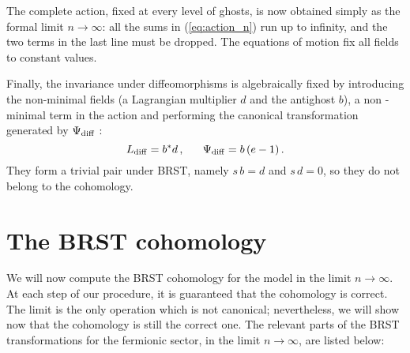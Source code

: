 \documentclass[a4paper,12pt]{article}
\begin{document}
The complete action, fixed at every level of ghosts, is now obtained
simply as the formal limit $n \to \infty$: all the sums in
(\ref{eq:action_n}) run up to infinity, and the two terms in the last
line must be dropped.  The equations of motion fix all fields to
constant values.  

Finally, the invariance under diffeomorphisms is algebraically fixed 
by introducing the non-minimal fields (a Lagrangian multiplier $d$ and the 
antighost $b$), a non -minimal term in the action and performing the 
canonical transformation generated by $\Psi_{\rm diff}~$: 
\begin{equation}
  \label{diff_ga}
  L_{\rm diff} = b^* d \,, ~~~~~ \Psi_{\rm diff} = b \, ( e - 1)\,. 
\end{equation}
They form a trivial pair under BRST, namely $s \, b = d$ and $s \, d = 0$, so they 
do not belong to the cohomology. 



\section{The BRST cohomology}
\label{sec:cohomology}

We will now compute the BRST cohomology for the model in the limit $n
\to \infty$. At each step of our procedure, it is guaranteed that the
cohomology is correct. The limit is the only operation which is not
canonical; nevertheless, we will show now that the cohomology is still
the correct one.  
The relevant parts of the BRST transformations for the fermionic 
sector, in the limit $n \to \infty$, are listed below:
\end{document}
